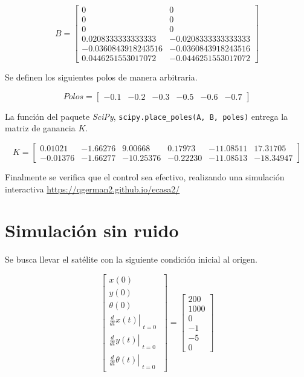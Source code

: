 \documentclass[titlepage, letterpaper]{article}
\begin{document}
\begin{equation*}
	B = \left[\begin{matrix}0 & 0\\0 & 0\\0 & 0\\0.0208333333333333 & -0.0208333333333333\\-0.0360843918243516 & -0.0360843918243516\\0.0446251553017072 & -0.0446251553017072\end{matrix}\right]
\end{equation*}

Se definen los siguientes polos de manera arbitraria.

\begin{equation*}
	Polos = \left[\begin{matrix}-0.1 & -0.2 & -0.3 & -0.5 & -0.6 & -0.7\end{matrix}\right]
\end{equation*}

La función del paquete \emph{SciPy}, \texttt{scipy.place\_poles(A, B, poles)} entrega la matriz de ganancia $K$.

\begin{equation*}
	K = \left[\begin{matrix}0.01021 & -1.66276 & 9.00668 & 0.17973 & -11.08511 & 17.31705\\-0.01376 & -1.66277 & -10.25376 & -0.22230 & -11.08513 & -18.34947\end{matrix}\right]
\end{equation*}

Finalmente se verifica que el control sea efectivo, realizando una simulación interactiva \url{https://qgerman2.github.io/ecasa2/}

\section{Simulación sin ruido}

Se busca llevar el satélite con la siguiente condición inicial al origen.

\begin{equation*}\left[\begin{matrix}x{\left(0 \right)}\\y{\left(0 \right)}\\\theta{\left(0 \right)}\\\left. \frac{d}{d t} x{\left(t \right)} \right|_{\substack{ t=0 }}\\\left. \frac{d}{d t} y{\left(t \right)} \right|_{\substack{ t=0 }}\\\left. \frac{d}{d t} \theta{\left(t \right)} \right|_{\substack{ t=0 }}\end{matrix}\right] = \left[\begin{matrix}200\\1000\\0\\-1\\-5\\0\end{matrix}\right]\end{equation*}
\end{document}
